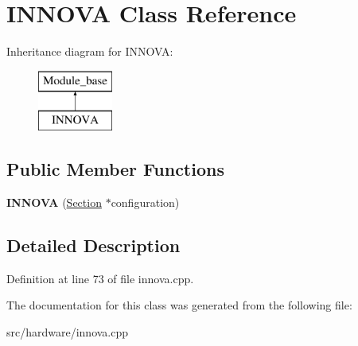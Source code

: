 \hypertarget{classINNOVA}{\section{I\-N\-N\-O\-V\-A Class Reference}
\label{classINNOVA}
}
Inheritance diagram for I\-N\-N\-O\-V\-A\-:\begin{figure}[H]
\begin{center}
\leavevmode
\includegraphics[height=2.000000cm]{classINNOVA}
\end{center}
\end{figure}
\subsection*{Public Member Functions}
\begin{DoxyCompactItemize}
\item 
\hypertarget{classINNOVA_a9ce1407a469660a8e791653bec22ad29}{{\bfseries I\-N\-N\-O\-V\-A} (\hyperlink{classSection}{Section} $\ast$configuration)}\label{classINNOVA_a9ce1407a469660a8e791653bec22ad29}

\end{DoxyCompactItemize}


\subsection{Detailed Description}


Definition at line 73 of file innova.\-cpp.



The documentation for this class was generated from the following file\-:\begin{DoxyCompactItemize}
\item 
src/hardware/innova.\-cpp\end{DoxyCompactItemize}
